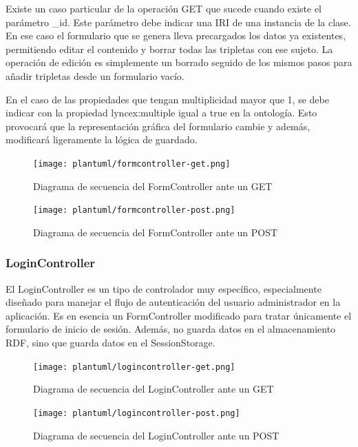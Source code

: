 \documentclass[12pt]{report} %
\begin{document}
Existe un caso particular de la operación GET que sucede cuando existe el parámetro \_id. Este parámetro debe indicar una IRI de una instancia de la clase. En ese caso el formulario que se genera lleva precargados los datos ya existentes, permitiendo editar el contenido y borrar todas las tripletas con ese sujeto. La operación de edición es simplemente un borrado seguido de los mismos pasos para añadir tripletas desde un formulario vacío.

En el caso de las propiedades que tengan multiplicidad mayor que 1, se debe indicar con la propiedad lyncex:multiple igual a true en la ontología. Esto provocará que la representación gráfica del formulario cambie y además, modificará ligeramente la lógica de guardado.

\begin{figure}
    \centering
    \texttt{[image: plantuml/formcontroller-get.png]}
    \caption{Diagrama de secuencia del FormController ante un GET}
    \label{fig:formcontrollerget}
\end{figure}

\begin{figure}
    \centering
    \texttt{[image: plantuml/formcontroller-post.png]}
    \caption{Diagrama de secuencia del FormController ante un POST}
    \label{fig:formcontrollerpost}
\end{figure}

\subsubsection{LoginController}

El LoginController es un tipo de controlador muy específico, especialmente diseñado para manejar el flujo de autenticación del usuario administrador en la aplicación. Es en esencia un FormController modificado para tratar únicamente el formulario de inicio de sesión. Además, no guarda datos en el almacenamiento RDF, sino que guarda datos en el SessionStorage.

\begin{figure}
    \centering
    \texttt{[image: plantuml/logincontroller-get.png]}
    \caption{Diagrama de secuencia del LoginController ante un GET}
    \label{fig:logincontrollerget}
\end{figure}

\begin{figure}[h]
    \centering
    \texttt{[image: plantuml/logincontroller-post.png]}
    \caption{Diagrama de secuencia del LoginController ante un POST}
    \label{fig:logincontrollerpost}
\end{figure}
\end{document}
